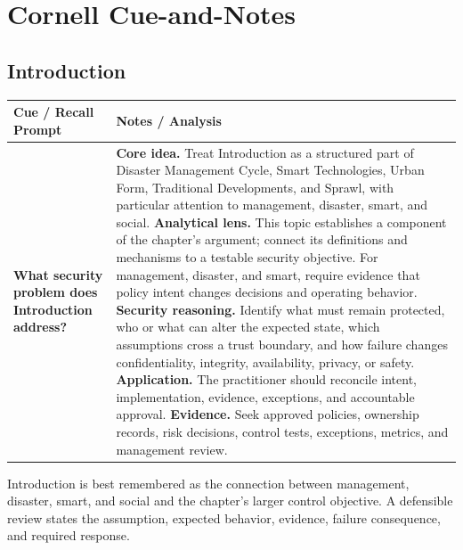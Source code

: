 \documentclass[11pt]{article}
\newcommand{\CornellHeader}{%
\rowcolor{Navy}\color{white}\bfseries Cue / Recall Prompt & \color{white}\bfseries Notes / Analysis\\\hline}
\newcommand{\CornellRow}[2]{%
\cellcolor{CueGray}\RaggedRight\textbf{#1} & \RaggedRight #2\\\hline}
\begin{document}
\section*{Cornell Cue-and-Notes}
\subsection*{Introduction}
\begin{longtable}{>{\RaggedRight\arraybackslash}p{}|>{\RaggedRight\arraybackslash}p{}}
\CornellHeader
\CornellRow{What security problem does Introduction address?}{\textbf{Core idea.} Treat Introduction as a structured part of Disaster Management Cycle, Smart Technologies, Urban Form, Traditional Developments, and Sprawl, with particular attention to management, disaster, smart, and social. \textbf{Analytical lens.} This topic establishes a component of the chapter's argument; connect its definitions and mechanisms to a testable security objective. For management, disaster, and smart, require evidence that policy intent changes decisions and operating behavior. \textbf{Security reasoning.} Identify what must remain protected, who or what can alter the expected state, which assumptions cross a trust boundary, and how failure changes confidentiality, integrity, availability, privacy, or safety. \textbf{Application.} The practitioner should reconcile intent, implementation, evidence, exceptions, and accountable approval. \textbf{Evidence.} Seek approved policies, ownership records, risk decisions, control tests, exceptions, metrics, and management review.}
\end{longtable}
\begin{topicsummary}
Introduction is best remembered as the connection between management, disaster, smart, and social and the chapter's larger control objective. A defensible review states the assumption, expected behavior, evidence, failure consequence, and required response.
\end{topicsummary}
\end{document}
